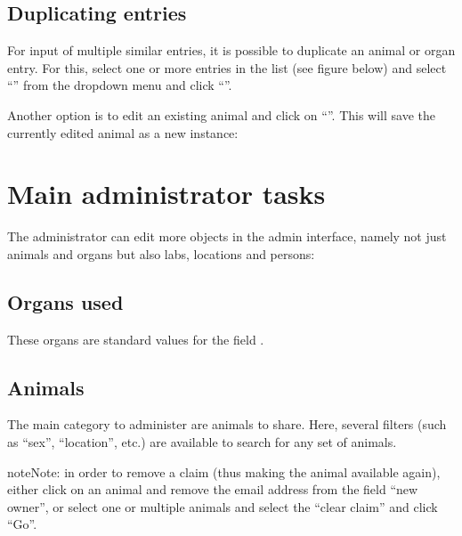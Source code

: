 \documentclass[letterpaper,10pt,openany,oneside,english]{sphinxmanual}
\begin{document}
\section{Duplicating entries}
\label{\detokenize{index:duplicating-entries}}
For input of multiple similar entries, it is possible to duplicate an animal or organ entry. For this, select one
or more entries in the list (see figure below) and select “” from the dropdown menu and click
“”.

\noindent{}

Another option is to edit an existing animal and click on “”. This will save the
currently edited animal as a new instance:

\noindent{}


\chapter{Main administrator tasks}
\label{\detokenize{index:main-administrator-tasks}}
The administrator can edit more objects in the admin interface, namely not just animals and organs
but also labs, locations and persons:

\noindent{}


\section{Organs used}
\label{\detokenize{index:organs-used}}
These organs are standard values for the field .


\section{Animals}
\label{\detokenize{index:id3}}
The main category to administer are animals to share.
Here, several filters (such as “sex”, “location”, etc.) are available to search for any set of animals.

\noindent{}

\begin{sphinxadmonition}{note}{Note:}
in order to remove a claim (thus making the animal available again), either click on an animal
and remove the email address from the field “new owner”, or select one or multiple animals and
select the “clear claim”  and click “Go”.
\end{sphinxadmonition}
\end{document}

